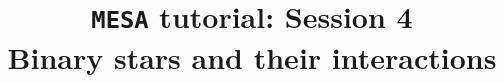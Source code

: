 \documentclass[11pt,a4paper]{article}
\begin{document}
\title{
    \textbf{\texttt{MESA} tutorial: Session 4} \\
    \textbf{\Large Binary stars and their interactions}
}
\date{}
\maketitle
\vspace{-1cm}

\noindent




\end{document}
